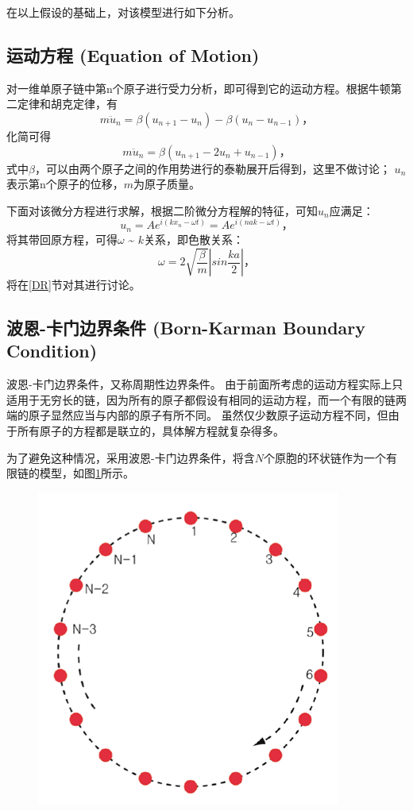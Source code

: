 \documentclass[declarePage]{ecnuthesis}
\begin{document}
在以上假设的基础上，对该模型进行如下分析。

\subsection{运动方程 (Equation of Motion)}

对一维单原子链中第n个原子进行受力分析，即可得到它的运动方程。根据牛顿第二定律和胡克定律，有
\begin{equation}
    m \ddot{u}_n = \beta (u_{n+1} - u_n) - \beta (u_n - u_{n-1}) \text{，}
\end{equation}
化简可得
\begin{equation}
    m \ddot{u}_n = \beta (u_{n+1} - 2u_n + u_{n-1}) \text{，}
\end{equation}
式中$\beta$，可以由两个原子之间的作用势进行的泰勒展开后得到，这里不做讨论；%
$u_n$表示第n个原子的位移，$m$为原子质量。

下面对该微分方程进行求解，根据二阶微分方程解的特征，可知$u_n$应满足：
\begin{equation}
    u_n = A e^{i(kx_n - \omega t)} = A e^{i(nak - \omega t)} \text{，} \label{EOM}
\end{equation}
将其带回原方程，可得$\omega$ \~{} $k$关系，即色散关系：
\begin{equation}
    \omega = 2 \sqrt{\frac{\beta}{m}} \left | sin \frac{ka}{2} \right | \text{，} \label{DRE}
\end{equation}
将在\ref{DR}节对其进行讨论。

\subsection{波恩-卡门边界条件 (Born-Karman Boundary Condition)}
波恩-卡门边界条件，又称周期性边界条件。%
由于前面所考虑的运动方程实际上只适用于无穷长的链，因为所有的原子都假设有相同的运动方程，而一个有限的链两端的原子显然应当与内部的原子有所不同。%
虽然仅少数原子运动方程不同，但由于所有原子的方程都是联立的，具体解方程就复杂得多。

为了避免这种情况，采用波恩-卡门边界条件，将含$N$个原胞的环状链作为一个有限链的模型，如图\ref{BKBC}所示。
\begin{figure}[htb]
    \centering
    \includegraphics[width=.5\textwidth]{BKBC.png}
    \label{BKBC}
\end{figure}
\end{document}
